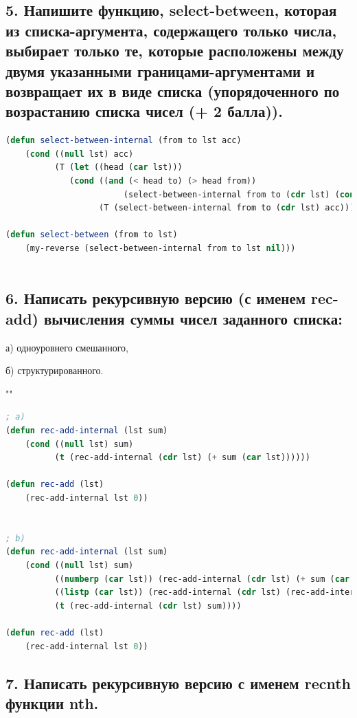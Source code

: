 \documentclass[12pt]{report}
\begin{document}
\subsection*{5. Напишите функцию, select-between, которая из списка-аргумента, содержащего только
	числа, выбирает только те, которые расположены между двумя указанными границами-аргументами и возвращает их в виде списка (упорядоченного по возрастанию списка чисел
	(+ 2 балла)).}

\begin{lstlisting}[label=6xd, caption=Решение задания №5, language=lisp]
(defun select-between-internal (from to lst acc)
	(cond ((null lst) acc)
		  (T (let ((head (car lst)))
			 (cond ((and (< head to) (> head from)) 
			 	   		(select-between-internal from to (cdr lst) (cons head acc)))
				   (T (select-between-internal from to (cdr lst) acc)))))))

(defun select-between (from to lst)
	(my-reverse (select-between-internal from to lst nil)))
	
\end{lstlisting}

\subsection*{6. Написать рекурсивную версию (с именем rec-add) вычисления суммы чисел заданного
	списка:}

а) одноуровнего смешанного,

б) структурированного.

""\newline
\begin{lstlisting}[label=6xd, caption=Решение задания №6, language=lisp]
; a)
(defun rec-add-internal (lst sum) 
	(cond ((null lst) sum) 
		  (t (rec-add-internal (cdr lst) (+ sum (car lst))))))
		  
(defun rec-add (lst) 
	(rec-add-internal lst 0))


; b)
(defun rec-add-internal (lst sum) 
	(cond ((null lst) sum) 
		  ((numberp (car lst)) (rec-add-internal (cdr lst) (+ sum (car lst))))
		  ((listp (car lst)) (rec-add-internal (cdr lst) (rec-add-internal (car lst) sum)))
		  (t (rec-add-internal (cdr lst) sum))))

(defun rec-add (lst) 
	(rec-add-internal lst 0))
\end{lstlisting}

\subsection*{7. Написать рекурсивную версию с именем recnth функции nth.}
\end{document}
